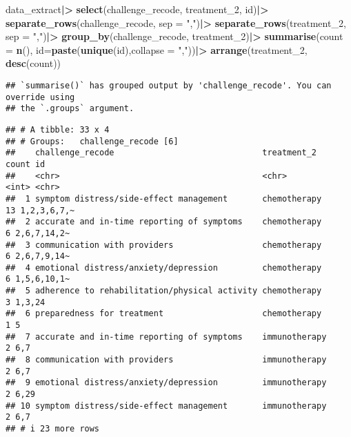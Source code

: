 \documentclass[
]{article}
\newenvironment{Shaded}{\begin{snugshade}}{\end{snugshade}}
\newcommand{\AttributeTok}[1]{\textcolor[rgb]{0.13,0.29,0.53}{#1}}
\newcommand{\FunctionTok}[1]{\textcolor[rgb]{0.13,0.29,0.53}{\textbf{#1}}}
\newcommand{\NormalTok}[1]{#1}
\newcommand{\SpecialCharTok}[1]{\textcolor[rgb]{0.81,0.36,0.00}{\textbf{#1}}}
\newcommand{\StringTok}[1]{\textcolor[rgb]{0.31,0.60,0.02}{#1}}
\begin{document}
\begin{Shaded}
\begin{Highlighting}[]
\NormalTok{data\_extract}\SpecialCharTok{|\textgreater{}}
  \FunctionTok{select}\NormalTok{(challenge\_recode, treatment\_2, id)}\SpecialCharTok{|\textgreater{}}
  \FunctionTok{separate\_rows}\NormalTok{(challenge\_recode, }\AttributeTok{sep =} \StringTok{","}\NormalTok{)}\SpecialCharTok{|\textgreater{}}
  \FunctionTok{separate\_rows}\NormalTok{(treatment\_2, }\AttributeTok{sep =} \StringTok{","}\NormalTok{)}\SpecialCharTok{|\textgreater{}}
  \FunctionTok{group\_by}\NormalTok{(challenge\_recode, treatment\_2)}\SpecialCharTok{|\textgreater{}}
  \FunctionTok{summarise}\NormalTok{(}\AttributeTok{count =} \FunctionTok{n}\NormalTok{(),}
            \AttributeTok{id=}\FunctionTok{paste}\NormalTok{(}\FunctionTok{unique}\NormalTok{(id),}\AttributeTok{collapse =} \StringTok{","}\NormalTok{))}\SpecialCharTok{|\textgreater{}}
  \FunctionTok{arrange}\NormalTok{(treatment\_2, }\FunctionTok{desc}\NormalTok{(count))}
\end{Highlighting}
\end{Shaded}

\begin{verbatim}
## `summarise()` has grouped output by 'challenge_recode'. You can override using
## the `.groups` argument.
\end{verbatim}

\begin{verbatim}
## # A tibble: 33 x 4
## # Groups:   challenge_recode [6]
##    challenge_recode                              treatment_2   count id         
##    <chr>                                         <chr>         <int> <chr>      
##  1 symptom distress/side-effect management       chemotherapy     13 1,2,3,6,7,~
##  2 accurate and in-time reporting of symptoms    chemotherapy      6 2,6,7,14,2~
##  3 communication with providers                  chemotherapy      6 2,6,7,9,14~
##  4 emotional distress/anxiety/depression         chemotherapy      6 1,5,6,10,1~
##  5 adherence to rehabilitation/physical activity chemotherapy      3 1,3,24     
##  6 preparedness for treatment                    chemotherapy      1 5          
##  7 accurate and in-time reporting of symptoms    immunotherapy     2 6,7        
##  8 communication with providers                  immunotherapy     2 6,7        
##  9 emotional distress/anxiety/depression         immunotherapy     2 6,29       
## 10 symptom distress/side-effect management       immunotherapy     2 6,7        
## # i 23 more rows
\end{verbatim}
\end{document}
